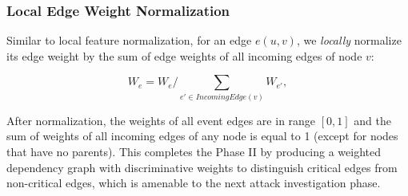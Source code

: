 \subsubsection{Local Edge Weight Normalization}
\label{subsubsec:edge-normalization}

Similar to local feature normalization, for an edge $e(u, v)$, we \emph{locally} normalize its edge weight by the sum of edge weights of all incoming edges of node $v$: 

\begin{equation}
    \label{eq:local-weight-normalization}
    W_e = W_e/\sum_{e' \in IncomingEdge(v)} W_{e'},
\end{equation}

After normalization, the weights of all event edges are in range $[0, 1]$ and the sum of weights of all incoming edges of any node is equal to 1 (except for nodes that have no parents). This completes the Phase II by producing a weighted dependency graph with discriminative weights to distinguish critical edges from non-critical edges, which is amenable to the next attack investigation phase.


